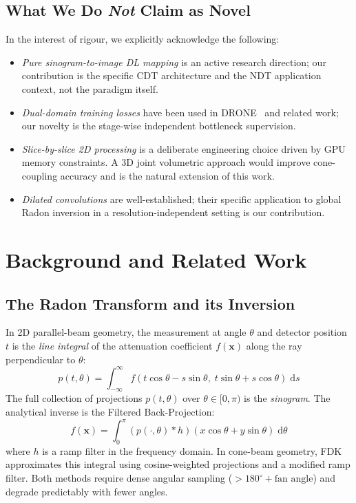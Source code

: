 \documentclass[10pt,twocolumn]{article}
\newcommand{\myvec}[1]{\bm{#1}}
\begin{document}
\subsection{What We Do \emph{Not} Claim as Novel}
\label{sec:not_novel}

In the interest of rigour, we explicitly acknowledge the following:
\begin{itemize}[leftmargin=*, noitemsep]
    \item \textit{Pure sinogram-to-image DL mapping} is an active
    research direction; our contribution is the specific CDT
    architecture and the NDT application context, not the paradigm
    itself.
    \item \textit{Dual-domain training losses} have been used in
    DRONE~\cite{wu2021drone} and related work;
    our novelty is the stage-wise independent bottleneck supervision.
    \item \textit{Slice-by-slice 2D processing} is a deliberate
    engineering choice driven by GPU memory constraints.
    A 3D joint volumetric approach would improve cone-coupling
    accuracy and is the natural extension of this work.
    \item \textit{Dilated convolutions} are well-established;
    their specific application to global Radon inversion in a
    resolution-independent setting is our contribution.
\end{itemize}

\section{Background and Related Work}
\label{sec:related}

\subsection{The Radon Transform and its Inversion}

In 2D parallel-beam geometry, the measurement at angle $\theta$ and
detector position $t$ is the \textit{line integral} of the
attenuation coefficient $f(\myvec{x})$ along the ray
perpendicular to $\theta$:
\begin{equation}
    p(t, \theta) = \int_{-\infty}^{\infty}
        f(t\cos\theta - s\sin\theta,\; t\sin\theta + s\cos\theta)\;
    \mathrm{d}s
    \label{eq:radon}
\end{equation}
The full collection of projections $p(t, \theta)$ over
$\theta \in [0, \pi)$ is the \textit{sinogram}.
The analytical inverse is the Filtered Back-Projection:
\begin{equation}
    f(\myvec{x}) = \int_0^{\pi}
        \left(p(\cdot, \theta) * h\right)(x\cos\theta + y\sin\theta)
    \;\mathrm{d}\theta
    \label{eq:fbp}
\end{equation}
where $h$ is a ramp filter in the frequency domain.
In cone-beam geometry, FDK~\cite{feldkamp1984} approximates this
integral using cosine-weighted projections and a modified ramp filter.
Both methods require dense angular sampling ($>180^\circ + \text{fan angle}$)
and degrade predictably with fewer angles.
\end{document}
